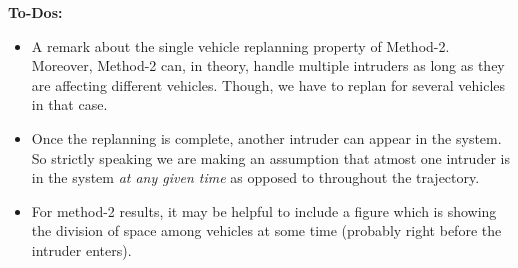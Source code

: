 
\textbf{To-Dos:}
\begin{itemize}
\item A remark about the single vehicle replanning property of Method-2. Moreover, Method-2 can, in theory, handle multiple intruders as long as they are affecting different vehicles. Though, we have to replan for several vehicles in that case. 
\item Once the replanning is complete, another intruder can appear in the system. So strictly speaking we are making an assumption that atmost one intruder is in the system \textit{at any given time} as opposed to throughout the trajectory.
\item For method-2 results, it may be helpful to include a figure which is showing the division of space among vehicles at some time (probably right before the intruder enters). 
\end{itemize}
